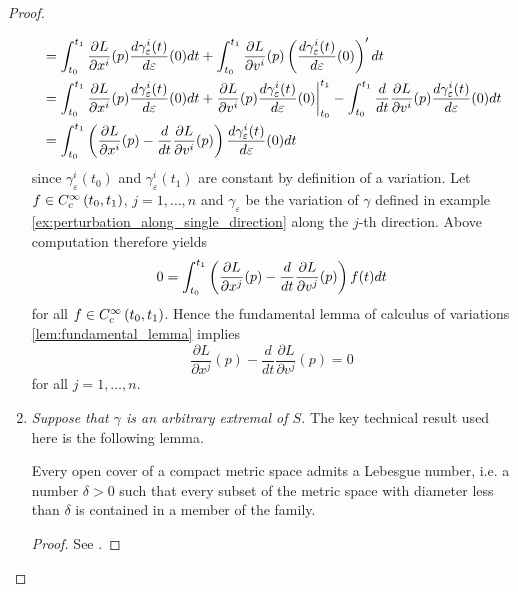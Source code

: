 \begin{proof}
\begin{enumerate}[label = \textit{Step \arabic*:},wide=0pt]
\begin{align*}
				&= \int_{t_0}^{t_1} \frac{\partial L}{\partial x^i}(p)\frac{d\gamma_\varepsilon^i(t)}{d\varepsilon}(0)dt + \int_{t_0}^{t_1}\frac{\partial L}{\partial v^i}(p)\del[3]{\frac{d\gamma_\varepsilon^i(t)}{d\varepsilon}(0)}'dt\\
				&= \int_{t_0}^{t_1} \frac{\partial L}{\partial x^i}(p)\frac{d\gamma_\varepsilon^i(t)}{d\varepsilon}(0)dt + \frac{\partial L}{\partial v^i}(p)\frac{d\gamma_\varepsilon^i(t)}{d\varepsilon}(0)\bigg\vert_{t_0}^{t_1} - \int_{t_0}^{t_1} \frac{d}{dt}\frac{\partial L}{\partial v^i}(p)\frac{d\gamma_\varepsilon^i(t)}{d\varepsilon}(0)dt\\
				&= \int_{t_0}^{t_1} \del[3]{\frac{\partial L}{\partial x^i}(p) - \frac{d}{dt}\frac{\partial L}{\partial v^i}(p)}\frac{d\gamma_\varepsilon^i(t)}{d\varepsilon}(0)dt 
			\end{align*}
			\noindent since $\gamma^i_\varepsilon(t_0)$ and $\gamma^i_\varepsilon(t_1)$ are constant by definition of a variation. Let $f \in C^\infty_c\intoo[0]{t_0,t_1}$, $j = 1,\dots,n$ and $\gamma_\varepsilon$ be the variation of $\gamma$ defined in example \ref{ex:perturbation_along_single_direction} along the $j$-th direction. Above computation therefore yields
			\begin{equation*}
				0 = \int_{t_0}^{t_1} \del[3]{\frac{\partial L}{\partial x^j}(p) - \frac{d}{dt}\frac{\partial L}{\partial v^j}(p)}f(t) dt
			\end{equation*}
			\noindent for all $f \in C^\infty_c\intoo[0]{t_0,t_1}$. Hence the fundamental lemma of calculus of variations \ref{lem:fundamental_lemma} implies
			\begin{equation*}
				\frac{\partial L}{\partial x^j}(p) - \frac{d}{dt}\frac{\partial L}{\partial v^j}(p) = 0
			\end{equation*}
			\noindent for all $j = 1,\dots,n$.
		\item \textit{Suppose that $\gamma$ is an arbitrary extremal of $S$.} The key technical result used here is the following lemma.
			\begin{lemma}
				\label{lem:Lebesgue_number_lemma}
				Every open cover of a compact metric space admits a Lebesgue number, i.e. a number $\delta > 0$ such that every subset of the metric space with diameter less than $\delta$ is contained in a member of the family.
			\end{lemma}

			\begin{proof}
				See \cite[194]{lee:topological_manifolds:2011}.
			\end{proof}


\end{enumerate}
\end{proof}
